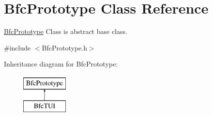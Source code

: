 \hypertarget{classBfcPrototype}{\section{Bfc\-Prototype Class Reference}
\label{classBfcPrototype}
}


\hyperlink{classBfcPrototype}{Bfc\-Prototype} Class is abstract base class.  




{\ttfamily \#include $<$Bfc\-Prototype.\-h$>$}

Inheritance diagram for Bfc\-Prototype\-:\begin{figure}[H]
\begin{center}
\leavevmode
\includegraphics[height=2.000000cm]{classBfcPrototype}
\end{center}
\end{figure}
